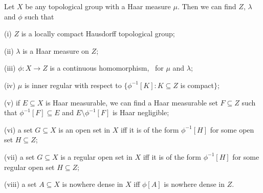 Let $X$ be any topological group with a Haar
measure $\mu$.   Then we can find $Z$, $\lambda$ and $\phi$ such that

(i) $Z$ is a locally compact Hausdorff topological group;

(ii) $\lambda$ is a Haar measure on $Z$;

(iii) $\phi:X\to Z$ is a continuous homomorphism,
\imp\ for $\mu$ and $\lambda$;

(iv) $\mu$ is inner regular with respect to
$\{\phi^{-1}[K]:K\subseteq Z$ is compact$\}$;

(v) if $E\subseteq X$ is Haar measurable, we can find a Haar measurable set
$F\subseteq Z$ such that $\phi^{-1}[F]\subseteq E$ and
$E\setminus\phi^{-1}[F]$ is Haar negligible;

(vi) a set $G\subseteq X$ is an open set in $X$ iff it is of the
form $\phi^{-1}[H]$ for some open set $H\subseteq Z$;

(vii) a set $G\subseteq X$ is a regular open set in $X$ iff it is of the
form $\phi^{-1}[H]$ for some regular open set $H\subseteq Z$;

(viii) a set $A\subseteq X$ is nowhere dense in $X$ iff $\phi[A]$ is
nowhere dense in $Z$.


